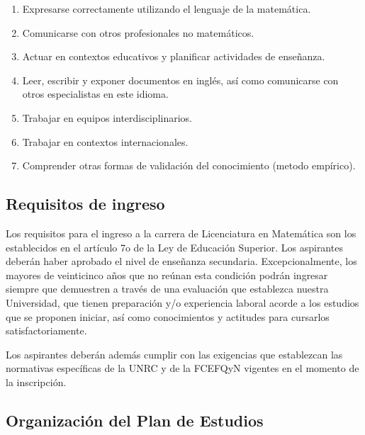 \documentclass[a4paper, 12pt]{article}
\begin{document}
\begin{enumerate}
\item {Expresarse correctamente
utilizando el lenguaje de la
matemática.} 
 


\item {Comunicarse
con otros profesionales no matemáticos}. 

 

\item {Actuar en contextos educativos y planificar actividades de enseñanza}. 
 


\item {Leer, escribir y exponer documentos en
inglés, así como comunicarse con otros
especialistas en este idioma}. 

 


\item {Trabajar en equipos
interdisciplinarios.} 


\item  Trabajar en contextos internacionales.
 
\item Comprender otras formas de validación del conocimiento (metodo empírico).  


\end{enumerate}


\subsection{Requisitos de ingreso}


Los requisitos para el ingreso a la carrera de Licenciatura en Matemática son los establecidos
en el artículo 7o de la Ley de Educación Superior. Los aspirantes deberán haber aprobado
el nivel de enseñanza secundaria. Excepcionalmente, los mayores de veinticinco años que
no reúnan esta condición podrán ingresar siempre que demuestren a través de una
evaluación que establezca nuestra Universidad, que tienen preparación y/o experiencia
laboral acorde a los estudios que se proponen iniciar, así como conocimientos y actitudes
para cursarlos satisfactoriamente.

Los aspirantes deberán además cumplir con las exigencias
 que establezcan las normativas específicas de la UNRC y de la FCEFQyN    vigentes en el momento 
 de la inscripción. 




\subsection{Organización del Plan de Estudios}
\end{document}

